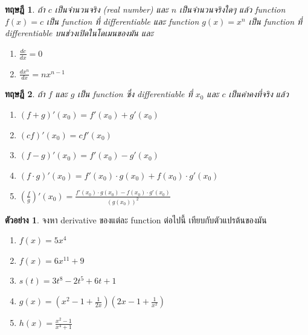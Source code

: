 \documentclass[
]{book}
\newtheorem{theorem}{ทฤษฎี}[chapter]
\theoremstyle{definition}
\theoremstyle{definition}
\newtheorem{example}{ตัวอย่าง}[chapter]
\theoremstyle{definition}
\theoremstyle{definition}
\theoremstyle{remark}
\begin{document}
\begin{theorem}

ถ้า \(c\) เป็นจำนวนจริง (real number) และ \(n\) เป็นจำนวนจริงใดๆ แล้ว function
\(f(x) = c\) เป็น function ที่ differentiable และ function \(g(x) = x^n\) เป็น
function ที่ differentiable บนช่วงเปิดในโดเมนของมัน และ

\begin{enumerate}
\def\labelenumi{\arabic{enumi}.}
\item
  \(\frac{dc}{dx} = 0\)
\item
  \(\frac{dx^n}{dx} = n x^{n-1}\)
\end{enumerate}

\end{theorem}

\begin{theorem}

ถ้า \(f\) และ \(g\) เป็น function ซึ่ง differentiable ที่ \(x_0\) และ \(c\)
เป็นค่าคงที่จริง แล้ว

\begin{enumerate}
\def\labelenumi{\arabic{enumi}.}
\item
  \((f+g)'(x_0) = f'(x_0) + g'(x_0)\)
\item
  \((cf)'(x_0) = cf'(x_0)\)
\item
  \((f-g)'(x_0) = f'(x_0) - g'(x_0)\)
\item
  \((f \cdot g)'(x_0) = f'(x_0) \cdot g(x_0) + f(x_0)\cdot g'(x_0)\)
\item
  \((\frac{f}{g})'(x_0) = \frac{f'(x_0) \cdot g(x_0) - f(x_0)\cdot g'(x_0)}{(g(x_0))^2}\)
\end{enumerate}

\end{theorem}

\begin{example}

จงหา derivative ของแต่ละ function ต่อไปนี้ เทียบกับตัวแปรต้นของมัน

\begin{enumerate}
\def\labelenumi{(\arabic{enumi})}
\item
  \(f(x) = 5x^4\)
\item
  \(f(x) = 6x^{11} + 9\)
\item
  \(s(t) = 3t^8 - 2t^5 + 6t + 1\)
\item
  \(g(x) = \left( x^2 - 1 + \frac{1}{2x} \right) \left(2x - 1 + \frac{1}{x^2} \right)\)
\item
  \(h(x) = \frac{x^2 -1}{x^4 + 1}\)
\end{enumerate}

\end{example}
\end{document}
